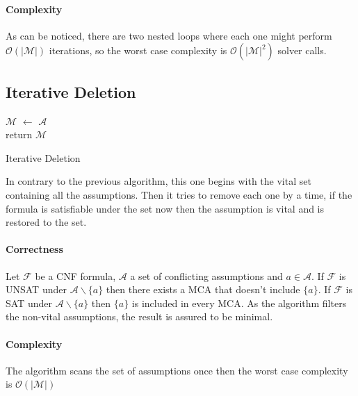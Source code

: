 \documentclass[]{article}
\begin{document}
	\paragraph{Complexity} As can be noticed, there are two nested loops where each one might perform $ \mathcal{O \left( | M |\right) } $ iterations, so the worst case complexity is $ \mathcal{O \left( | M |^\text{2} \right) } $ solver calls.
	
	
	\subsection{Iterative Deletion}
		\begin{algorithm}[H]
			$ \mathcal{M} $ $\leftarrow$ $ \mathcal{A} $\\
			return $ \mathcal{M} $
			\caption{Iterative Deletion}
		\end{algorithm}
		In contrary to the previous algorithm, this one begins with the vital set containing all the assumptions. Then it tries to remove each one by a time, if the formula is satisfiable under the set now then the assumption is vital and is restored to the set.
		
		\paragraph{Correctness} Let $ \mathcal{F} $ be a CNF formula, $ \mathcal{A} $ a set of conflicting assumptions and $  a \in \mathcal{A} $. If $ \mathcal{F} $ is UNSAT under $ \mathcal{A} \backslash \{a\} $ then there exists a MCA that doesn't include $ \{a\} $. If $ \mathcal{F} $ is SAT under $ \mathcal{A} \backslash \{a\} $ then $ \{a\} $ is included in every MCA. As the algorithm filters the non-vital assumptions, the result is assured to be minimal.
		
		\paragraph{Complexity} The algorithm scans the set of assumptions once then the worst case complexity is $ \mathcal{O \left( | M | \right) } $
		
\end{document}
